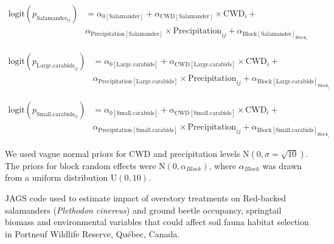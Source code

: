 \begin{align}
  \text{logit}(p_{\text{Salamander}_{ij}}) &= \alpha_{0[\text{Salamander}]} + \alpha_{\text{CWD}[\text{Salamander}]} \times \text{CWD}_i + \nonumber \\
  &\alpha_{\text{Precipitation}[\text{Salamander}]} \times \text{Precipitation}_{ij} + \alpha_{\text{Block}[\text{Salamander}]_{\text{Block}_i}} \nonumber
\end{align}

\begin{align}
  \text{logit}(p_{\text{Large.carabids}_{ij}}) &= \alpha_{0[\text{Large.carabids}]} + \alpha_{\text{CWD}[\text{Large.carabids}]} \times \text{CWD}_i + \\
  &\alpha_{\text{Precipitation}[\text{Large.carabids}]} \times \text{Precipitation}_{ij} + \alpha_{\text{Block}[\text{Large.carabids}]_{\text{Block}_i}} \nonumber 
\end{align}

\begin{align}
  \text{logit}(p_{\text{Small.carabids}_{ij}}) &= \alpha_{0[\text{Small.carabids}]} + \alpha_{\text{CWD}[\text{Small.carabids}]} \times \text{CWD}_i + \nonumber \\
  &\alpha_{\text{Precipitation}[\text{Small.carabids}]} \times \text{Precipitation}_{ij} + \alpha_{\text{Block}[\text{Small.carabids}]_{\text{Block}_i}} \nonumber 
\end{align}


We used vague normal priors for CWD and precipitation levels $\text{N}(0, \sigma = \sqrt{10})$. 
The priors for block random effects were $\text{N}(0, \alpha_{Block})$, where $\alpha_{Block}$ was drawn from a uniform distribution $\text{U}(0, 10)$. 

\clearpage


\begin{table}[ht]
\caption[JAGS code used to estimate impact of overstory treatments on Red-backed salamanders (\textit{Plethodon cinereus}) and ground beetle occupancy, springtail biomass and environmental variables that could affect soil fauna habitat selection.]
    {JAGS code used to estimate impact of overstory treatments on Red-backed salamanders (\textit{Plethodon cinereus}) and ground beetle occupancy, springtail biomass and environmental variables that could affect soil fauna habitat selection in Portneuf Wildlife Reserve, Québec, Canada.}
    \label{ann:SEM_script}
\end{table}

